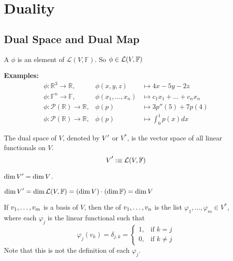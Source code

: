 
\section{Duality}
\subsection{Dual Space and Dual Map}

\setcounter{thm}{107}
\begin{mydef}
  A  $\phi$ is an element of $\mathcal{L}(V, \mathbb{F})$. So $\phi \in \mathcal{L}(V, \mathbb{F})$
\end{mydef}

\textbf{Examples:}
\begin{equation}
  \begin{array}{lll}
    \phi: \mathbb{R}^3  \to \mathbb{R}, &\phi (x,y,z)  & \mapsto 4x-5y-2z \\
    \phi: \mathbb{F}^n  \to \mathbb{F}, &\phi (x_1, \dots, x_n)
    & \mapsto c_1x_1 + \dots + c_nx_n  \\
    \phi: \mathcal{P} (\mathbb{R})  \to \mathbb{R},
    & \phi(p) & \mapsto 3p''(5) + 7p(4) \\
    \phi: \mathcal{P}(\mathbb{R}) \to \mathbb{R},
    & \phi(p)  &\mapsto \textstyle \int_{0}^{1} p(x) dx
  \end{array}
\end{equation}

\setcounter{thm}{109}
\begin{thm}
  The dual space of $V$, denoted by $\dual{V}$ or $V^{*}$, is the vector space of all linear functionals on $V$.
  \begin{equation}
    \dual{V} :\equiv \linmap(V, \myF)
  \end{equation}
\end{thm}

\begin{thm}
  $\dim \dual{V} = \dim V$.
\end{thm}
\begin{prf}
  $\dim \dual{V} = \dim \mathcal{L}(V, \mathbb{F})=(\dim V) \cdot (\dim \mathbb{F}) = \dim V $
\end{prf}


\begin{mydef}
  If $v_1, \dots, v_m$ is a basis of $V$, then the  of $v_1, \dots, v_n$ is the list $\varphi_1, \dots, \varphi_m \in V^{*}$, where each $\varphi_j$ is the linear functional such that
  \begin{equation}
    \varphi_j(v_k) = \delta_{j,k} =
  \begin{cases}
    1,  & \text{if $k=j$} \\
    0, & \text{if $k \neq j$}
  \end{cases}
  \end{equation}
  Note that this is not the definition of each $\varphi_j$.
\end{mydef}

